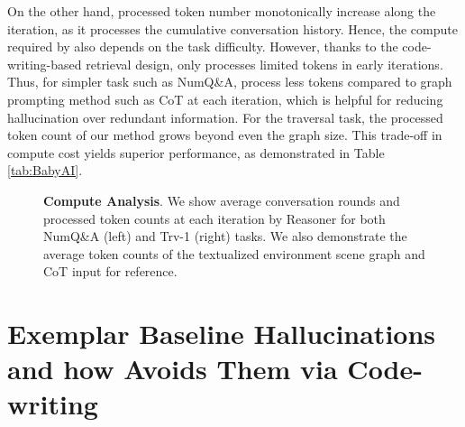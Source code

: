 On the other hand, \RwR processed token number monotonically increase along the iteration, as it processes the cumulative conversation history. Hence, the compute required by \RwR also depends on the task difficulty. However, thanks to the code-writing-based retrieval design, \RwR only processes limited tokens in early iterations. Thus, for simpler task such as NumQ\&A, \RwR process less tokens compared to graph prompting method such as CoT at each iteration, which is helpful for reducing hallucination over redundant information.
For the traversal task, the processed token count of our method grows beyond even the graph size. This trade-off in compute cost yields superior performance, as demonstrated in Table \ref{tab:BabyAI}. 

\begin{figure}[h!]
    \centering
    \caption{\textbf{Compute Analysis}. We show average conversation rounds and processed token counts at each iteration by \RwR Reasoner for both NumQ\&A (left) and Trv-1 (right) tasks. We also demonstrate the average token counts of the textualized environment scene graph and CoT input for reference.}
    \label{fig:CompAnlyz}
\end{figure}


\section{Exemplar Baseline Hallucinations and how \RwR Avoids Them via Code-writing}
\label{app:BaselineFailures}

